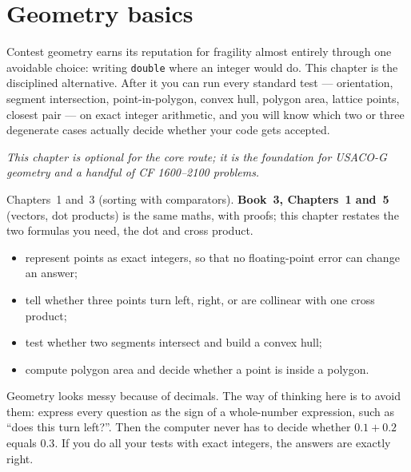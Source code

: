\chapter{Geometry basics}\label{ch:geom}

Contest geometry earns its reputation for fragility almost entirely
through one avoidable choice: writing \texttt{double} where an
integer would do. This chapter is the disciplined alternative.
After it you can run every standard test --- orientation, segment
intersection, point-in-polygon, convex hull, polygon area, lattice
points, closest pair --- on exact integer arithmetic, and you will
know which two or three degenerate cases actually decide whether
your code gets accepted.

\emph{This chapter is optional for the core route; it is the
foundation for USACO-G geometry and a handful of CF
1600--2100 problems.}

\begin{rulebox}
Chapters~1 and~3 (sorting with comparators). \textbf{Book~3, Chapters~1 and~5} (vectors, dot products) is the same maths, with proofs; this chapter restates the two formulas you need, the dot and cross product.
\end{rulebox}
\begin{wins}
\begin{itemize}
\item represent points as exact integers, so that no floating-point error can change an answer;
\item tell whether three points turn left, right, or are collinear with one cross product;
\item test whether two segments intersect and build a convex hull;
\item compute polygon area and decide whether a point is inside a polygon.
\end{itemize}
\end{wins}
\begin{principle}
Geometry looks messy because of decimals. The way of thinking here is to avoid them: express every question as the sign of a whole-number expression, such as ``does this turn left?''. Then the computer never has to decide whether $0.1+0.2$ equals $0.3$. If you do all your tests with exact integers, the answers are exactly right.
\end{principle}

